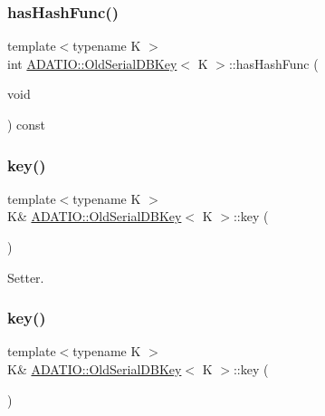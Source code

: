 \subsubsection{\texorpdfstring{hasHashFunc()}{hasHashFunc()}\hspace{0.1cm}{\footnotesize\ttfamily [3/3]}}
{\footnotesize\ttfamily template$<$typename K $>$ \\
int \mbox{\hyperlink{classADATIO_1_1OldSerialDBKey}{A\+D\+A\+T\+I\+O\+::\+Old\+Serial\+D\+B\+Key}}$<$ K $>$\+::has\+Hash\+Func (\begin{DoxyParamCaption}\item[{void}]{ }\end{DoxyParamCaption}) const\hspace{0.3cm}{\ttfamily [inline]}}

\mbox{\label{classADATIO_1_1OldSerialDBKey_ab191c26e658125d7ac4378c8b74d6f1b}} 
\subsubsection{\texorpdfstring{key()}{key()}\hspace{0.1cm}{\footnotesize\ttfamily [1/6]}}
{\footnotesize\ttfamily template$<$typename K $>$ \\
K\& \mbox{\hyperlink{classADATIO_1_1OldSerialDBKey}{A\+D\+A\+T\+I\+O\+::\+Old\+Serial\+D\+B\+Key}}$<$ K $>$\+::key (\begin{DoxyParamCaption}{ }\end{DoxyParamCaption})\hspace{0.3cm}{\ttfamily [inline]}}



Setter. 

\mbox{\label{classADATIO_1_1OldSerialDBKey_ab191c26e658125d7ac4378c8b74d6f1b}} 
\subsubsection{\texorpdfstring{key()}{key()}\hspace{0.1cm}{\footnotesize\ttfamily [2/6]}}
{\footnotesize\ttfamily template$<$typename K $>$ \\
K\& \mbox{\hyperlink{classADATIO_1_1OldSerialDBKey}{A\+D\+A\+T\+I\+O\+::\+Old\+Serial\+D\+B\+Key}}$<$ K $>$\+::key (\begin{DoxyParamCaption}{ }\end{DoxyParamCaption})\hspace{0.3cm}{\ttfamily [inline]}}



